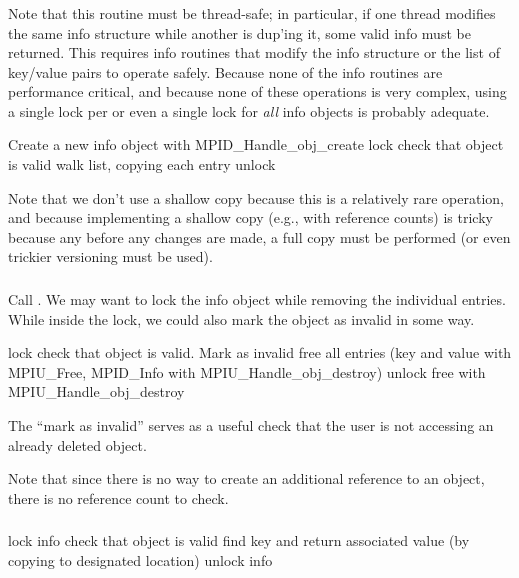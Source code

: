 \documentclass{article}
\begin{document}
\subsubsection{}
Note that this routine must be thread-safe; in particular, if one
thread modifies the same info structure while another is dup'ing it,
some valid info must be returned.  This requires info routines that
modify the info structure or the list of key/value pairs to operate safely.
Because none of the info routines are performance critical, and because none
of these operations is very complex, using a single lock per 
or even a single lock for \emph{all} info objects is probably adequate.
\begin{algorithm}
Create a new info object with MPID_Handle_obj_create
lock
check that object is valid
walk list, copying each entry
unlock
\end{algorithm}
Note that we don't use a shallow copy because this is a relatively
rare operation, and because implementing a shallow copy (e.g., with
reference counts) is tricky because any before any changes are made,
a full copy must be performed (or even trickier versioning must be
used).

\subsubsection{}
Call .  We may want to lock the info object
while removing the individual entries.  While inside the lock, we
could also mark the object as invalid in some way.

\begin{algorithm}
lock
check that object is valid.  Mark as invalid
free all entries (key and value with MPIU_Free, MPID_Info with 
    MPIU_Handle_obj_destroy)
unlock
free with MPIU_Handle_obj_destroy
\end{algorithm}
The ``mark as invalid'' serves as a
useful check that the user is not accessing an already deleted
object.  

Note that since there is no way to create an additional reference to an
 object, there is no reference count to check.

\subsubsection{}
\begin{algorithm}
lock info
check that object is valid
find key and return associated value (by copying to designated location)
unlock info
\end{algorithm}
\end{document}
